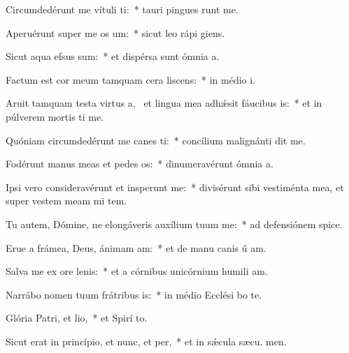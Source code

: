 \item Circumdedérunt me vítuli ti:~* tauri pingues runt me.
\item Aperuérunt super me os um:~* sicut leo rápi  giens.
\item Sicut aqua efsus sum:~* et dispérsa sunt ómnia  a.
\item Factum est cor meum tamquam cera liscens:~* in médio  i.
\item Aruit tamquam testa virtus a,~\pscross{} et lingua mea adhǽsit fáucibus is:~* et in púlverem mortis ti me.
\item Quóniam circumdedérunt me canes ti:~* concílium malignánti dit me.
\item Fodérunt manus meas et pedes os:~* dinumeravérunt ómnia  a.
\item Ipsi vero consideravérunt et insperunt me:~* divisérunt sibi vestiménta mea, et super vestem meam mi tem.
\item Tu autem, Dómine, ne elongáveris auxílium tuum  me:~* ad defensiónem  spice.
\item Erue a frámea, Deus, ánimam am:~* et de manu canis ú am.
\item Salva me ex ore lenis:~* et a córnibus unicórnium humili am.
\item Narrábo nomen tuum frátribus is:~* in médio Ecclési bo te.
\item Glória Patri, et lio,~* et Spirí to.
\item Sicut erat in princípio, et nunc, et per,~* et in sǽcula sæcu. men.
